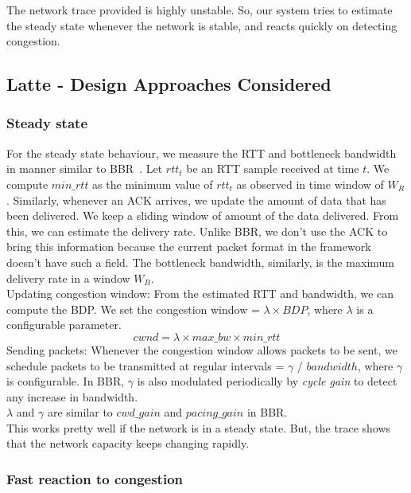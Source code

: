 \documentclass{article}
\begin{document}
The network trace provided is highly unstable. So, our system tries to
estimate the steady state whenever the network is stable, and reacts
quickly on detecting congestion.\\

\subsection{Latte - Design Approaches Considered}
\subsubsection{Steady state}
For the steady state behaviour, we measure the RTT and bottleneck
bandwidth in manner similar to BBR~\cite{bbr}. Let $rtt_t$ be an RTT
sample received at time $t$. We compute $min\_rtt$ as the minimum
value of $rtt_t$ as observed in time window of $W_R$. Similarly,
whenever an ACK arrives, we update the amount of data that has been
delivered. We keep a sliding window of amount of the data delivered.
From this, we can estimate the delivery rate. Unlike BBR, we don't
use the ACK to bring this information because the current packet
format in the framework doesn't have such a field. The bottleneck
bandwidth, similarly, is the maximum delivery rate in a window
$W_B$.\\

Updating congestion window: From the estimated RTT and bandwidth,
we can compute the BDP. We set the congestion window = $\lambda \times
BDP$, where $\lambda$ is a configurable parameter.\\
\[
cwnd = \lambda \times max\_bw \times min\_rtt
\]
Sending packets: Whenever the congestion window allows packets to be
sent, we schedule packets to be transmitted at regular intervals =
$\gamma$ / $bandwidth$, where $\gamma$ is configurable.  In BBR,
$\gamma$ is also modulated periodically by \textit{cycle gain} to
detect any increase in bandwidth.\\
$\lambda$ and $\gamma$ are similar to $cwd\_gain$ and $pacing\_gain$
in BBR.\\
This works pretty well if the network is in a steady state. But, the
trace shows that the network capacity keeps changing rapidly.


\subsubsection{Fast reaction to congestion}
\end{document}
